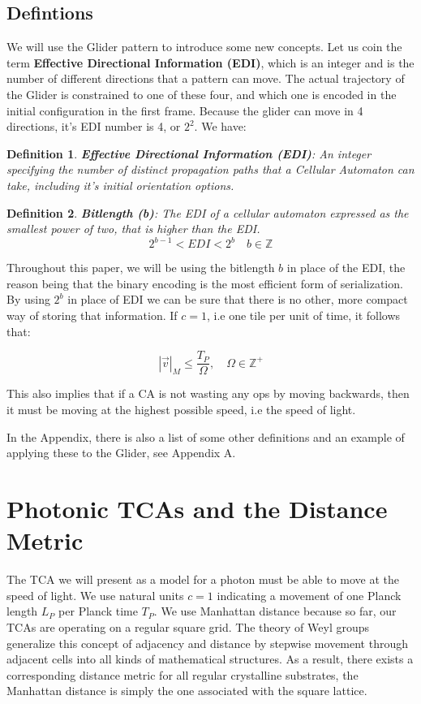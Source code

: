 \documentclass[notitlepage]{article}
\newtheorem{definition}{Definition}[section]
\begin{document}
\subsection{Defintions}
We will use the Glider pattern to introduce some new concepts. Let us coin the term \textbf{Effective Directional Information (EDI)}, which is an integer and is the number of different directions that a pattern can move. The actual trajectory of the Glider is constrained to one of these four, and which one is encoded in the initial configuration in the first frame. Because the glider can move in 4 directions, it's EDI number is 4, or $2^2$. We have:

\begin{definition}
\textbf{Effective Directional Information (EDI)}: An integer specifying the number of distinct propagation paths that a Cellular Automaton can take, including it's initial orientation options. 
\end{definition}

\begin{definition}
\textbf{\textit{Bitlength} \textbf{(b)}}: The EDI of a cellular automaton expressed as the smallest power of two, that is higher than the EDI.
\begin{equation}
2^{b-1} < EDI < 2^b  \quad b \in \mathbb{Z}
\end{equation} 
\end{definition}

Throughout this paper, we will be using the bitlength $b$ in place of the EDI, the reason being that the binary encoding is the most efficient form of serialization. By using $2^b$ in place of EDI we can be sure that there is no other, more compact way of storing that information. If $c = 1$, i.e one tile per unit of time, it follows that:

\begin{equation}
|\vec{v}|_M \leq \frac{T_P}{\Omega},	\quad \Omega \in \mathbb{Z}^+
\end{equation} 

This also implies that if a CA is not wasting any ops by moving backwards, then it must be moving at the highest possible speed, i.e the speed of light.

In the Appendix, there is also a list of some other definitions and an example of applying these to the Glider, see Appendix A.

\section{Photonic TCAs and the Distance Metric}
The TCA we will present as a model for a photon must be able to move at the speed of light. We use natural units $c =1$ indicating a movement of one Planck length $L_P$ per Planck time $T_P$. We use Manhattan distance because so far, our TCAs are operating on a regular square grid. The theory of Weyl groups generalize this concept of adjacency and distance by stepwise movement through adjacent cells into all kinds of mathematical structures. As a result, there exists a corresponding distance metric for all regular crystalline substrates, the Manhattan distance is simply the one associated with the square lattice.
\end{document}
